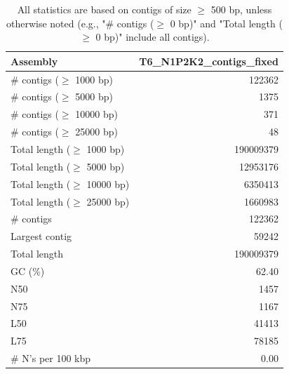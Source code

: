 \documentclass[12pt,a4paper]{article}
\begin{document}
\begin{table}[ht]
\begin{center}
\caption{All statistics are based on contigs of size $\geq$ 500 bp, unless otherwise noted (e.g., "\# contigs ($\geq$ 0 bp)" and "Total length ($\geq$ 0 bp)" include all contigs).}
\begin{tabular}{|l*{1}{|r}|}
\hline
Assembly & T6\_N1P2K2\_contigs\_fixed \\ \hline
\# contigs ($\geq$ 1000 bp) & 122362 \\ \hline
\# contigs ($\geq$ 5000 bp) & 1375 \\ \hline
\# contigs ($\geq$ 10000 bp) & 371 \\ \hline
\# contigs ($\geq$ 25000 bp) & 48 \\ \hline
Total length ($\geq$ 1000 bp) & 190009379 \\ \hline
Total length ($\geq$ 5000 bp) & 12953176 \\ \hline
Total length ($\geq$ 10000 bp) & 6350413 \\ \hline
Total length ($\geq$ 25000 bp) & 1660983 \\ \hline
\# contigs & 122362 \\ \hline
Largest contig & 59242 \\ \hline
Total length & 190009379 \\ \hline
GC (\%) & 62.40 \\ \hline
N50 & 1457 \\ \hline
N75 & 1167 \\ \hline
L50 & 41413 \\ \hline
L75 & 78185 \\ \hline
\# N's per 100 kbp & 0.00 \\ \hline
\end{tabular}
\end{center}
\end{table}
\end{document}
